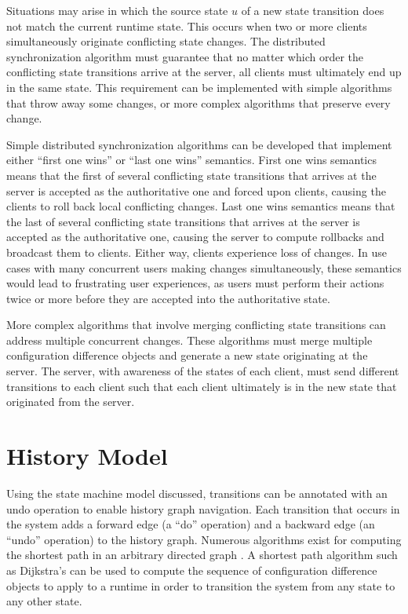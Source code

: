 Situations may arise in which the source state $u$ of a new state transition does not match the current runtime state. This occurs when two or more clients simultaneously originate conflicting state changes. The distributed synchronization algorithm must guarantee that no matter which order the conflicting state transitions arrive at the server, all clients must ultimately end up in the same state. This requirement can be implemented with simple algorithms that throw away some changes, or more complex algorithms that preserve every change.

Simple distributed synchronization algorithms can be developed that implement either ``first one wins'' or ``last one wins'' semantics. First one wins semantics means that the first of several conflicting state transitions that arrives at the server is accepted as the authoritative one and forced upon clients, causing the clients to roll back local conflicting changes. Last one wins semantics means that the last of several conflicting state transitions that arrives at the server is accepted as the authoritative one, causing the server to compute rollbacks and broadcast them to clients. Either way, clients experience loss of changes. In use cases with many concurrent users making changes simultaneously, these semantics would lead to frustrating user experiences, as users must perform their actions twice or more before they are accepted into the authoritative state.


More complex algorithms that involve merging conflicting state transitions can address multiple concurrent changes. These algorithms must merge multiple configuration difference objects and generate a new state originating at the server. The server, with awareness of the states of each client, must send different transitions to each client such that each client ultimately is in the new state that originated from the server.


\section{History Model}
Using the state machine model discussed, transitions can be annotated with an undo operation to enable history graph navigation. Each transition that occurs in the system adds a forward edge (a ``do'' operation) and a backward edge (an ``undo'' operation) to the history graph. Numerous algorithms exist for computing the shortest path in an arbitrary directed graph \cite{gallo1988shortest}. A shortest path algorithm such as Dijkstra's can be used to compute the sequence of configuration difference objects to apply to a runtime in order to transition the system from any state to any other state.


